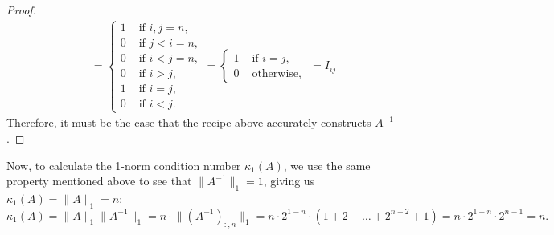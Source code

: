 \documentclass[11pt]{article}
\begin{document}
\begin{enumerate}
\begin{enumerate}
\begin{proof}
\begin{align*}
				             & = \begin{cases}
					                 1 & \text{ if } i,j=n, \\
					                 0 & \text{ if } j<i=n, \\
					                 0 & \text{ if } i<j=n, \\
					                 0 & \text{ if } i>j,   \\
					                 1 & \text{ if } i=j,   \\
					                 0 & \text{ if } i<j.
				                 \end{cases}
				            = \begin{cases}
					              1 & \text{ if } i=j,    \\
					              0 & \text{ otherwise, }
				              \end{cases}
				            = I_{ij}
			            \end{align*}
			            Therefore, it must be the case that the recipe above accurately constructs \(A^{-1}\).
		            \end{proof}
		            Now, to calculate the 1-norm condition number \(\kappa_1(A)\), we use the same property mentioned above to see that \(\lVert A^{-1} \rVert_1 = 1\), giving us \(\kappa_1(A) = \lVert A \rVert_1 = n\):
		            \[\kappa_1(A) = \lVert A \rVert_1 \lVert A^{-1} \rVert_1 = n \cdot \lVert (A^{-1})_{:,n} \rVert_1 = n \cdot 2^{1-n} \cdot (1 + 2 + \hdots + 2^{n-2} + 1) = n \cdot 2^{1-n} \cdot 2^{n-1} = n.\]
	      \end{enumerate}
\end{enumerate}
\end{document}
